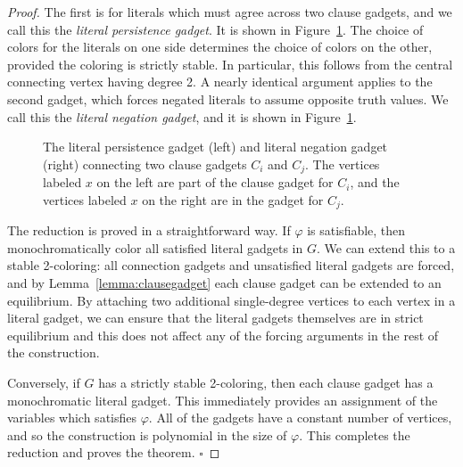 \documentclass{llncs}
\begin{document}
\begin{proof}
The first is for literals which must agree across two clause gadgets, and we
call this the \emph{literal persistence gadget}. It is shown in
Figure~\ref{fig:connectiongadgets}. The choice of colors for the literals on
one side determines the choice of colors on the other, provided the coloring is
strictly stable. In particular, this follows from the central connecting vertex
having degree 2. A nearly identical argument applies to the second gadget, which forces negated
literals to assume opposite truth values. We call this the \emph{literal
negation gadget}, and it is shown in Figure~\ref{fig:connectiongadgets}.

\begin{figure}[htb]
\centering
{}
\caption{The literal persistence gadget (left) and literal negation gadget
(right) connecting two clause gadgets $C_i$ and $C_j$. The vertices labeled $x$
on the left are part of the clause gadget for $C_i$, and the vertices labeled
$x$ on the right are in the gadget for $C_j$.}
\label{fig:connectiongadgets}
\end{figure}

The reduction is proved in a straightforward way. If $\varphi$ is satisfiable,
then monochromatically
color all satisfied literal gadgets in $G$. We can extend this to a
stable 2-coloring: all connection gadgets and unsatisfied literal gadgets are forced, and by
Lemma~\ref{lemma:clausegadget} each clause gadget can be extended to an
equilibrium. By attaching two additional single-degree vertices to each vertex
in a literal gadget, we can ensure that the literal gadgets themselves are in
strict equilibrium and this does not affect any of the forcing arguments in the
rest of the construction.

Conversely, if $G$ has a strictly stable 2-coloring, then each clause gadget
has a monochromatic literal gadget. This immediately provides an assignment of
the variables which satisfies $\varphi$. All of the gadgets have a constant
number of vertices, and so the construction is polynomial in the size of
$\varphi$. This completes the reduction and proves the theorem.
\hfill $\square$
\end{proof}
\end{document}
